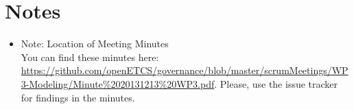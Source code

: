 \documentclass[a4paper, 11pt]{article}
\begin{document}
\section{Notes}
\begin{itemize}

\item Note: Location of Meeting Minutes\\
You can find these minutes here: \url{https://github.com/openETCS/governance/blob/master/scrumMeetings/WP3-Modeling/Minute%2020131213%20WP3.pdf}. Please, use the issue tracker for findings in the minutes.
\end{itemize}
\end{document}
